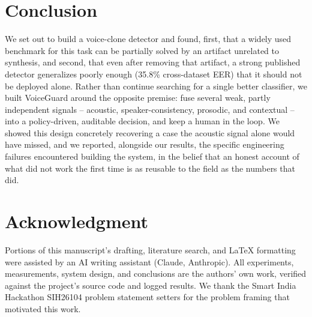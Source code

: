\documentclass[conference]{IEEEtran}
\begin{document}
\section{Conclusion}
\label{sec:conclusion}
We set out to build a voice-clone detector and found, first, that a
widely used benchmark for this task can be partially solved by an
artifact unrelated to synthesis, and second, that even after removing
that artifact, a strong published detector generalizes poorly enough
(35.8\% cross-dataset EER) that it should not be deployed alone. Rather
than continue searching for a single better classifier, we built
VoiceGuard around the opposite premise: fuse several weak, partly
independent signals -- acoustic, speaker-consistency, prosodic, and
contextual -- into a policy-driven, auditable decision, and keep a human
in the loop. We showed this design concretely recovering a case the
acoustic signal alone would have missed, and we reported, alongside our
results, the specific engineering failures encountered building the
system, in the belief that an honest account of what did not work the
first time is as reusable to the field as the numbers that did.

\section*{Acknowledgment}
Portions of this manuscript's drafting, literature search, and LaTeX
formatting were assisted by an AI writing assistant (Claude, Anthropic).
All experiments, measurements, system design, and conclusions are the
authors' own work, verified against the project's source code and
logged results. We thank the Smart India Hackathon SIH26104 problem
statement setters for the problem framing that motivated this work.
\end{document}
